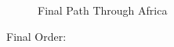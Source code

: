 \documentclass[12pt]{article}
\begin{document}
\begin{figure}
\begin{center}
\setlength\fboxsep{1.00pt}
\setlength\fboxrule{1.00pt}
\caption{Final Path Through Africa}
\end{center}
\end{figure}

Final Order:
\end{document}
